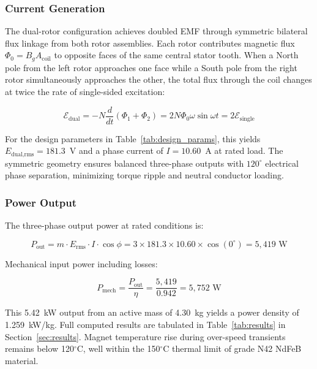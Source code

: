 \documentclass[12pt,a4paper]{article}
\begin{document}
\subsubsection{Current Generation}
The dual-rotor configuration achieves doubled EMF through symmetric bilateral flux linkage from both rotor assemblies. Each rotor contributes magnetic flux $\Phi_0 = B_g A_{\text{coil}}$ to opposite faces of the same central stator tooth. When a North pole from the left rotor approaches one face while a South pole from the right rotor simultaneously approaches the other, the total flux through the coil changes at twice the rate of single-sided excitation:

\begin{equation}
\mathcal{E}_{\text{dual}} = -N\frac{d}{dt}(\Phi_1 + \Phi_2) = 2N\Phi_0\omega\sin\omega t = 2\mathcal{E}_{\text{single}}
\end{equation}

For the design parameters in Table~\ref{tab:design_params}, this yields $E_{\text{dual,rms}} = 181.3$~V and a phase current of $I = 10.60$~A at rated load. The symmetric geometry ensures balanced three-phase outputs with $120^{\circ}$ electrical phase separation, minimizing torque ripple and neutral conductor loading.

\subsubsection{Power Output}
The three-phase output power at rated conditions is:

\begin{equation}
P_{\text{out}} = m \cdot E_{\text{rms}} \cdot I \cdot \cos\phi = 3 \times 181.3 \times 10.60 \times \cos(0^{\circ}) = 5{,}419 \text{ W}
\end{equation}

Mechanical input power including losses:

\begin{equation}
P_{\text{mech}} = \frac{P_{\text{out}}}{\eta} = \frac{5{,}419}{0.942} = 5{,}752 \text{ W}
\end{equation}

This 5.42~kW output from an active mass of 4.30~kg yields a power density of 1.259~kW/kg. Full computed results are tabulated in Table~\ref{tab:results} in Section~\ref{sec:results}. Magnet temperature rise during over-speed transients remains below 120$^{\circ}$C, well within the 150$^{\circ}$C thermal limit of grade N42 NdFeB material.
\end{document}
